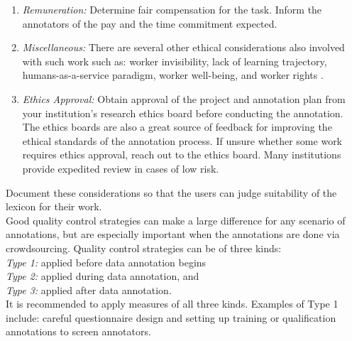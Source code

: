 \documentclass[11pt]{article}
\begin{document}
\begin{enumerate}[label=\alph*.]
\item \textit{Remuneration:} Determine fair compensation for the task. Inform the annotators of the pay and the time commitment expected.\\[-20pt]
\item \textit{Miscellaneous:}  
There are several other ethical considerations also involved with such work such as: worker invisibility, lack of learning trajectory, humans-as-a-service paradigm, worker well-being, and worker rights
\cite{dolmaya2011ethics,fort-etal-2011-last,standing2018ethical,irani2013turkopticon}.\\[-18pt]
\item \textit{Ethics Approval:} Obtain approval of the project and annotation plan from your institution's research ethics board before conducting the annotation. The ethics boards are also a great source of feedback for improving the ethical standards of the annotation process.
If unsure whether some work requires ethics approval, reach out to the ethics board. Many institutions provide expedited review in cases of low risk.\\[-18pt]
\end{enumerate}
\noindent Document %
these considerations %
so that the users %
can judge suitability of the lexicon for their work.\\[-4pt]

 Good quality control strategies can make a large difference for any scenario of annotations, but are especially important when the annotations are done via crowdsourcing. Quality control strategies can be of three kinds:\\[4pt]
\hspace*{3mm} \textit{Type 1:} applied before data annotation begins\\[2pt] 
\hspace*{3mm}  \textit{Type 2:} applied during data annotation, and\\[2pt]
\hspace*{3mm}  \textit{Type 3:} applied after data annotation.\\[4pt]
\noindent It is recommended to apply measures of all three kinds. Examples of Type 1 include:  careful questionnaire design and setting up training or qualification annotations to screen annotators.
\end{document}
